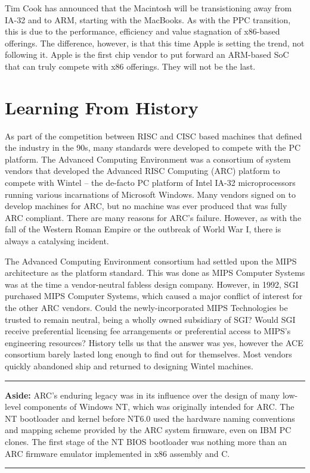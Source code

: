 \documentclass[12pt]{report}
\begin{document}
Tim Cook has announced that the Macintosh will be transistioning away from IA-32 and to ARM, starting with the MacBooks.
As with the PPC transition, this is due to the performance, efficiency and value stagnation of x86-based offerings. The difference,
however, is that this time Apple is setting the trend, not following it. Apple is the first chip vendor to put forward
an ARM-based SoC that can truly compete with x86 offerings. They will not be the last.

\section{Learning From History}
As part of the competition between RISC and CISC based machines that defined the industry in the 90s, many standards were
developed to compete with the PC platform. The Advanced Computing Environment was a consortium of system vendors that developed
the Advanced RISC Computing (ARC) platform to compete with Wintel -- the de-facto PC platform of Intel IA-32 microprocessors
running various incarnations of Microsoft Windows. Many vendors signed on to develop machines for ARC, but no machine was
ever produced that was fully ARC compliant. There are many reasons for ARC's failure. However, as with the fall of the
Western Roman Empire or the outbreak of World War I, there is always a catalysing incident.

The Advanced Computing Environment consortium had settled upon the MIPS architecture as the platform standard. This was
done as MIPS Computer Systems was at the time a vendor-neutral fabless design company. However, in 1992, SGI purchased
MIPS Computer Systems, which caused a major conflict of interest for the other ARC vendors. Could the newly-incorporated
MIPS Technologies be trusted to remain neutral, being a wholly owned subsidiary of SGI? Would SGI receive preferential
licensing fee arrangements or preferential access to MIPS's engineering resources? History tells us that the answer was
yes, however the ACE consortium barely lasted long enough to find out for themselves. Most vendors quickly abandoned ship
and returned to designing Wintel machines.
\rule{16cm}{0.4pt}

\small
\textbf{Aside:} ARC's enduring legacy was in its influence over the design of many low-level
components of Windows NT, which was originally intended for ARC. The NT bootloader and kernel before NT6.0 used the
hardware naming conventions and mapping scheme provided by the ARC system firmware, even on IBM PC clones. The first stage
of the NT BIOS bootloader was nothing more than an ARC firmware emulator implemented in x86 assembly and C. \\
\normalsize
\rule{16cm}{0.4pt}
\end{document}
